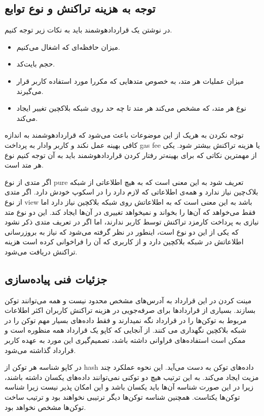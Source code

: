 \subsection{توجه به هزینه تراکنش و نوع توابع}
در نوشتن یک قراردادهوشمند باید به نکات زیر توجه کنیم.
\begin{itemize}
  \item
میزان حافظه‌ای که اشغال می‌کنیم.
  \item
حجم بایت‌کد.
  \item
میزان عملیات هر متد، به خصوص متدهایی که مکررا مورد استفاده کاربر قرار می‌گیرند.
  \item
نوع هر متد، که مشخص می‌کند هر متد تا چه حد روی شبکه بلاکچین تغییر ایجاد می‌کند.
\end{itemize}

توجه نکردن به هریک از این موضوعات باعث می‌شود که قراردادهوشمند به اندازه کافی بهینه عمل نکند و کاربر وادار به پرداخت gas fee یا هزینه تراکنش بیشتر شود. یکی از مهمترین نکاتی که برای بهینه‌تر رفتار کردن قراردادهوشمند باید به آن توجه کنیم نوع هر متد است.

اگر متدی از نوع pure تعریف شود به این معنی است که به هیچ اطلاعاتی از شبکه بلاک‌چین نیاز ندارد و همه‌ی اطلاعاتی که لازم دارد را در اسکوپ
خودش دارد. اگر متدی از نوع view باشد به این معنی است که به اطلاعاتش روی شبکه بلاکچین نیاز دارد اما فقط می‌خواهد که آن‌ها را بخواند و نمیخواهد تغییری در آن‌ها ایجاد کند. این دو نوع متد نیازی به پرداخت کارمزد تراکنش توسط کاربر ندارند، اما اگر در تعریف متدی ذکر نشود که یکی از این دو نوع است، اینطور در نظر گرفته می‌شود که نیاز به بروزرسانی اطلاعاتش در شبکه بلاکچین دارد و از کاربری که آن را فراخوانی کرده است هزینه تراکنش دریافت می‌شود.


\subsection{جزئیات فنی پیاده‌سازی}
مینت کردن در این قرارداد به آدرس‌های مشخص محدود نیست و همه می‌توانند توکن بسازند. بسیاری از قراردادها برای صرفه‌جویی در هزینه تراکنش کاربران اکثر اطلاعات مربوط به توکن‌ها را در قرارداد نگه نمیدارند و فقط داده‌های بسیار مهم توکن را در شبکه بلاکچین نگهداری می کنند. از آنجایی که کاپو یک قرارداد همه منظوره است و ممکن است استفاده‌های فراوانی داشته باشد، تصمیم‌گیری این مورد به عهده کاربر قرارداد گذاشته می‌شود.

در کاپو شناسه هر توکن از hash داده‌های توکن به دست می‌آید. این نحوه عملکرد چند مزیت ایجاد می‌کند. به این ترتیب هیچ دو توکنی نمی‌توانند داده‌های یکسان داشته باشند، زیرا در این صورت شناسه آن‌ها باید یکسان باشد و این امکان پذیر نیست زیرا شناسه توکن‌ها یکتاست. همچنین شناسه توکن‌ها دیگر ترتیبی نخواهند بود و ترتیب ساخت توکن‌ها مشخص نخواهد بود.

